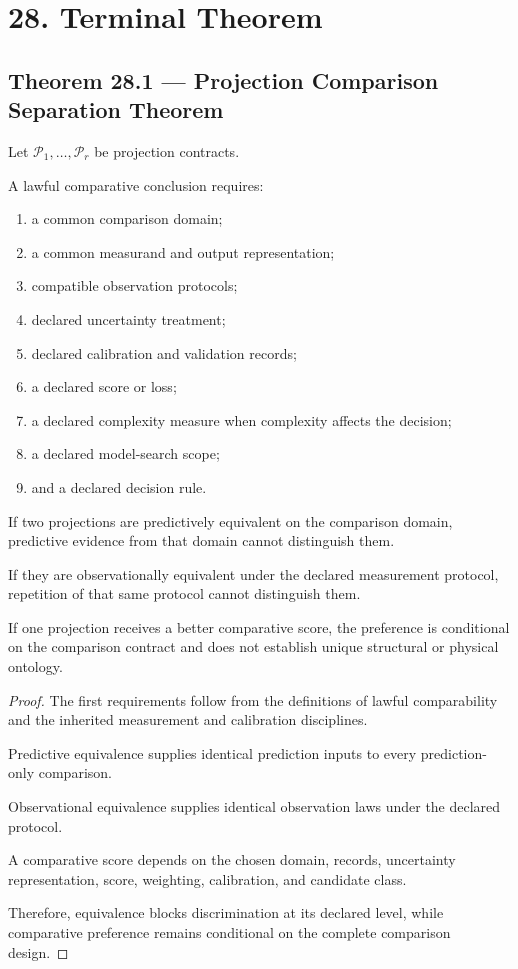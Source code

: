 \documentclass[11pt,oneside,openany]{book}
\newcommand{\PCsection}[1]{%
  \section*{#1}\addcontentsline{toc}{section}{#1}%
}
\newcommand{\PCsubsection}[1]{%
  \subsection*{#1}%
}
\begin{document}
\PCsection{28. Terminal Theorem}

\PCsubsection{Theorem 28.1 --- Projection Comparison Separation Theorem}

Let \(\mathcal P_1,\ldots,\mathcal P_r\) be projection contracts.

A lawful comparative conclusion requires:

\begin{enumerate}
\item a common comparison domain;
\item a common measurand and output representation;
\item compatible observation protocols;
\item declared uncertainty treatment;
\item declared calibration and validation records;
\item a declared score or loss;
\item a declared complexity measure when complexity affects the decision;
\item a declared model-search scope;
\item and a declared decision rule.
\end{enumerate}
If two projections are predictively equivalent on the comparison domain, predictive evidence from that domain cannot distinguish them.

If they are observationally equivalent under the declared measurement protocol, repetition of that same protocol cannot distinguish them.

If one projection receives a better comparative score, the preference is conditional on the comparison contract and does not establish unique structural or physical ontology.

\begin{proof}
The first requirements follow from the definitions of lawful comparability and the inherited measurement and calibration disciplines.

Predictive equivalence supplies identical prediction inputs to every prediction-only comparison.

Observational equivalence supplies identical observation laws under the declared protocol.

A comparative score depends on the chosen domain, records, uncertainty representation, score, weighting, calibration, and candidate class.

Therefore, equivalence blocks discrimination at its declared level, while comparative preference remains conditional on the complete comparison design.


\end{proof}
\end{document}
